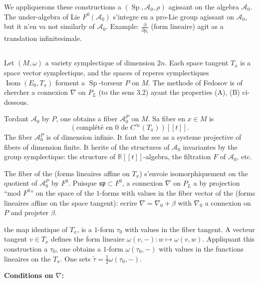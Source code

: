 \documentclass[11pt,a4paper]{article}
\theoremstyle{plain}
\theoremstyle{definition}
\DeclareMathOperator{\Sp}{Sp}
\DeclareMathOperator{\Isom}{Isom}
\newcommand{\R}{\mathbb{R}}
\begin{document}
We appliquerons these constructions a $(\Sp, \mathcal{A}_{0}, \rho)$ agissant on the algebra $\mathcal{A}_{0}$.
The under-algebra of Lie $F^{0}(\mathcal{A}_{0})$ s'integre en a pro-Lie group agissant on $\mathcal{A}_{0}$,
but it n'en va not similarly of $\mathcal{A}_{0}$. Example: $\frac{\partial}{\partial p_{i}}$ (form lineaire) agit as a
translation infinitesimale.

\subsection{}
Let $(M,\omega)$ a variety symplectique of dimension $2n$. Each space tangent
$T_{x}$ is a space vector symplectique, and the spaces of reperes symplectiques
$\Isom(E_{0}, T_{x})$ forment a $\Sp$-torseur $P$ on $M$. The methode of Fedosov is of
chercher a connexion $\nabla$ on $P_{L}$ (to the sens 3.2) ayant the properties (A), (B)
ci-dessous.

Tordant $\mathcal{A}_{0}$ by $P$, one obtains a fiber $\mathcal{A}_{0}^{P}$ on $M$. Sa fiber en $x \in M$ is
\begin{equation}
(\text{compl\'et\'e en } 0 \text{ de } C^{\infty}(T_{x}))[[t]]. \tag{3.3.1}
\end{equation}
The fiber $\mathcal{A}_{0}^{P}$ is of dimension infinie. It faut the see as a systeme projective of fibers of dimension finite. It herite of the structures of $\mathcal{A}_{0}$ invariantes by the group symplectique: the structure of $\R[[t]]$-algebra, the filtration $F$ of $\mathcal{A}_{0}$, etc.

The fiber of the (forms lineaires affine on $T_{x}$) s'envoie isomorphiquement on
the quotient of $\mathcal{A}_{0}^{P}$ by $F^{0}$. Puisque $\mathfrak{sp} \subset F^{0}$, a connexion $\nabla$ on $P_{L}$ a by
projection ``mod $F^{0}$'' on the space of the $1$-forms with values in the fiber vector
of the (forms lineaires affine on the space tangent): ecrire $\nabla = \nabla_{0} + \beta$ with $\nabla_{0}$ a
connexion on $P$ and projeter $\beta$.

the map identique of $T_{x}$, is a $1$-form $\tau_{0}$ with values in the fiber tangent.
A vecteur tangent $v \in T_{x}$ defines the form lineaire $\omega(v, - ): w \mapsto \omega(v, w)$. Appliquant
this construction a $\tau_{0}$, one obtains a $1$-form $\omega(\tau_{0}, -)$ with values in the functions
lineaires on the $T_{x}$. One sets $\tilde{\tau} = \frac{1}{2} \omega(\tau_{0}, -)$.

\medskip
\noindent \textbf{Conditions on $\nabla$:}
\end{document}
